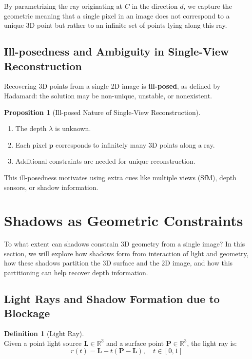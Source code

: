 \documentclass[12pt,a4paper]{article}
\theoremstyle{definition}
\newtheorem{definition}{Definition}[subsection]
\newtheorem{proposition}{Proposition}[subsection]
\newcommand{\R}{\mathbb{R}}
\newcommand{\vect}[1]{\bm{#1}}
\begin{document}
By parametrizing the ray originating at \(C\) in the direction \(d\), we capture the geometric meaning that a single pixel in an image does not correspond to a unique 3D point but rather to an infinite set of points lying along this ray.

\newpage

\subsection{Ill-posedness and Ambiguity in Single-View Reconstruction} \label{sec: illposed}
\vspace{-0.5em}
Recovering 3D points from a single 2D image is \textbf{ill-posed}, as defined by Hadamard: the solution may be non-unique, unstable, or nonexistent.
\vspace{-0.5em}
\begin{proposition}[Ill-posed Nature of Single-View Reconstruction]~\
\begin{enumerate}[label=(\alph*), noitemsep, topsep=0pt, parsep=0pt, partopsep=0pt]
    \item The depth \(\lambda\) is unknown.
    \item Each pixel \(\vect{p}\) corresponds to infinitely many 3D points along a ray.
    \item Additional constraints are needed for unique reconstruction.
\end{enumerate}
\end{proposition}

This ill-posedness motivates using extra cues like multiple views (SfM), depth sensors, or shadow information.
\vspace{-1.5em}

\section{Shadows as Geometric Constraints}
\vspace{-1em}
To what extent can shadows constrain 3D geometry from a single image? In this section, we will explore how shadows form from interaction of light and geometry, how these shadows partition the 3D surface and the 2D image, and how this partitioning can help recover depth information. 
\vspace{-1em}

\subsection{Light Rays and Shadow Formation due to Blockage}
\begin{definition}[Light Ray] \label{def:light_ray} ~\\
Given a point light source $\vect{L} \in \R^3$ and a surface point $\vect{P} \in \R^3$, the light ray is:
\begin{equation}
\boxed{r(t) = \vect{L} + t(\vect{P} - \vect{L}), \quad t \in [0,1]} \label{eq:light_ray}
\end{equation}
\end{definition}
\end{document}
